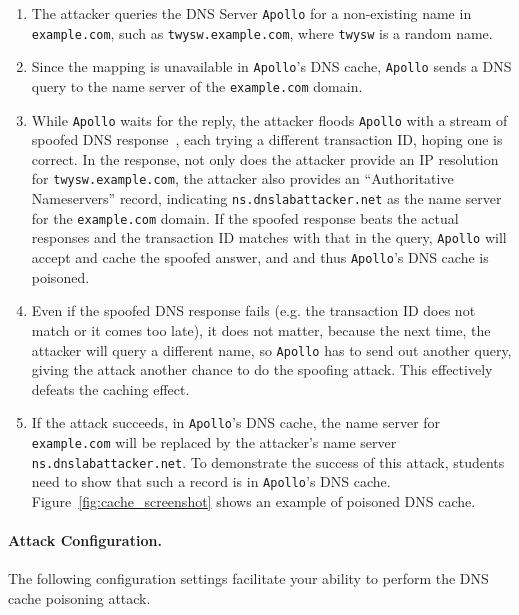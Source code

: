 \begin{enumerate}
\item The attacker queries the DNS Server {\tt Apollo} for a non-existing name in 
{\tt example.com}, such as {\tt twysw.example.com},
where {\tt twysw} is a random name. 

\item Since the mapping is unavailable in {\tt Apollo}'s DNS cache, 
{\tt Apollo} sends a DNS query to the name server of
the {\tt example.com} domain.

\item While {\tt Apollo} waits for the reply, 
the attacker floods {\tt Apollo} with a stream of spoofed DNS response~\cite{bib6}, 
each trying a different transaction ID, hoping one is correct.
In the response, not only does the attacker provide an IP resolution
for {\tt twysw.example.com}, the attacker 
also provides an ``Authoritative Nameservers'' record, indicating 
{\tt ns.dnslabattacker.net} as the name server for the {\tt example.com} domain.
If the spoofed response beats the actual responses and
the transaction ID matches with that in the query, 
{\tt Apollo} will accept and cache the spoofed answer, and
and thus {\tt Apollo}'s DNS cache is poisoned.  

\item Even if the spoofed DNS response fails (e.g.
the transaction ID does not match or it comes too late),
it does not matter, because the next time, the attacker will query
a different name, so {\tt Apollo} has to send out another query, 
giving the attack another chance to do the spoofing attack. 
This effectively defeats the caching effect.


\item If the attack succeeds, in {\tt Apollo}'s DNS cache, the
name server for {\tt example.com} will be replaced by the attacker's
name server {\tt ns.dnslabattacker.net}.
To demonstrate the success of this attack, students need to show that such a record 
is in {\tt Apollo}'s DNS cache. Figure~\ref{fig:cache_screenshot} shows 
an example of poisoned DNS cache.

\end{enumerate}




\paragraph{Attack Configuration.} The following configuration settings
facilitate your ability to perform the DNS cache poisoning attack. 

